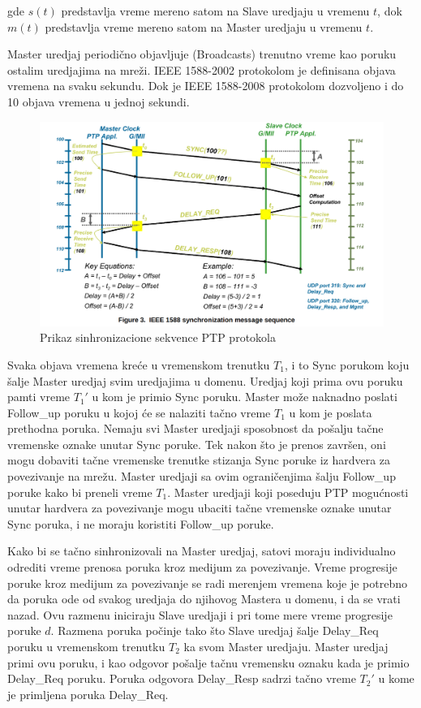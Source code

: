 \documentclass[a4paper,12pt, master]{etf}
\begin{document}
	gde $s(t)$ predstavlja vreme mereno satom na Slave uredjaju u vremenu $t$,
	dok $m(t)$ predstavlja vreme mereno satom na Master uredjaju u vremenu $t$.

	Master uredjaj periodi\v{c}no objavljuje (Broadcasts) trenutno vreme kao
	poruku ostalim uredjajima na mre\v{z}i. IEEE 1588-2002 protokolom je
	definisana objava vremena na svaku sekundu. Dok je IEEE 1588-2008
	protokolom dozvoljeno i do 10 objava vremena u jednoj sekundi.

	\begin{figure}[htb]
			\centering
			\includegraphics[scale=.3]{../pic/ieee_1588_sync_sequence.png}
			\caption{Prikaz sinhronizacione sekvence PTP protokola}
			\label{fig:ieee_1588_sync_sequence}
	\end{figure}

	Svaka objava vremena kre\'{c}e u vremenskom trenutku $T_1$, i to Sync
	porukom koju \v{s}alje Master uredjaj svim uredjajima u domenu. Uredjaj
	koji prima ovu poruku pamti vreme $T_1'$ u kom je primio Sync poruku.
	Master mo\v{z}e naknadno poslati Follow\_up poruku u kojoj \'{c}e se
	nalaziti ta\v{c}no vreme $T_1$ u kom je poslata prethodna poruka. Nemaju
	svi Master uredjaji sposobnost da po\v{s}alju ta\v{c}ne vremenske oznake
	unutar Sync poruke. Tek nakon \v{s}to je prenos zavr\v{s}en, oni mogu
	dobaviti ta\v{c}ne vremenske trenutke stizanja Sync poruke iz hardvera za
	povezivanje na mre\v{z}u. Master uredjaji sa ovim ograni\v{c}enjima
	\v{s}alju Follow\_up poruke kako bi preneli vreme $T_1$. Master uredjaji
	koji poseduju PTP mogu\'{c}nosti unutar hardvera za povezivanje mogu
	ubaciti ta\v{c}ne vremenske oznake unutar Sync poruka, i ne moraju
	koristiti Follow\_up poruke.

	Kako bi se ta\v{c}no sinhronizovali na Master uredjaj, satovi moraju
	individualno odrediti vreme prenosa poruka kroz medijum za povezivanje.
	Vreme progresije poruke kroz medijum za	povezivanje	se radi merenjem
	vremena koje je potrebno da poruka ode od svakog uredjaja do njihovog
	Mastera u domenu, i da se vrati nazad. Ovu razmenu iniciraju Slave uredjaji
	i pri tome mere vreme progresije poruke $d$. Razmena poruka po\v{c}inje
	tako \v{s}to Slave uredjaj \v{s}alje Delay\_Req poruku u vremenskom
	trenutku $T_2$ ka svom Master uredjaju. Master uredjaj primi ovu poruku, i
	kao	odgovor po\v{s}alje ta\v{c}nu vremensku oznaku kada je primio Delay\_Req
	poruku. Poruka odgovora	Delay\_Resp sadrzi ta\v{c}no vreme $T_2'$ u kome je
	primljena poruka Delay\_Req.
\end{document}
